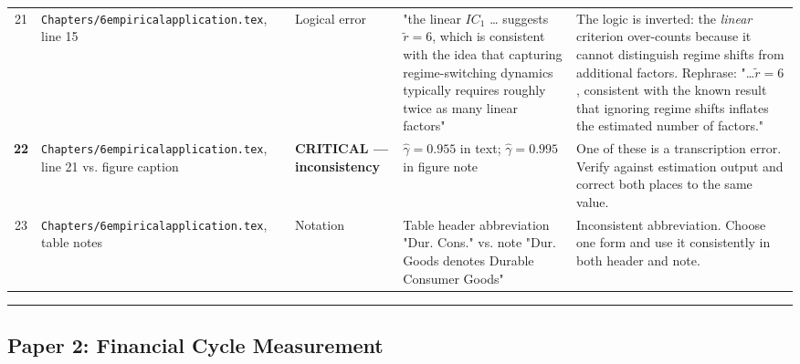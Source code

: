 \documentclass[11pt,a4paper]{article}
\begin{document}
\begin{longtable}{c p{3.2cm} l p{3.8cm} p{3.5cm}}
21 & \texttt{Chapters/6empiricalapplication.tex}, line 15 & Logical error & "the linear $IC_1$ … suggests $\tilde{r}=6$, which is consistent with the idea that capturing regime-switching dynamics typically requires roughly twice as many linear factors" & The logic is inverted: the \textit{linear} criterion over-counts because it cannot distinguish regime shifts from additional factors. Rephrase: "…$\tilde{r}=6$, consistent with the known result that ignoring regime shifts inflates the estimated number of factors." \\
\textbf{22} & \texttt{Chapters/6empiricalapplication.tex}, line 21 vs. figure caption & \textbf{CRITICAL — inconsistency} & $\hat{\gamma}=0.955$ in text; $\hat{\gamma}=0.995$ in figure note & One of these is a transcription error. Verify against estimation output and correct both places to the same value. \\
23 & \texttt{Chapters/6empiricalapplication.tex}, table notes & Notation & Table header abbreviation "Dur. Cons." vs. note "Dur. Goods denotes Durable Consumer Goods" & Inconsistent abbreviation. Choose one form and use it consistently in both header and note. \\
\bottomrule
\end{longtable}


\medskip\hrule\medskip

\subsection*{Paper 2: Financial Cycle Measurement}
\end{document}
